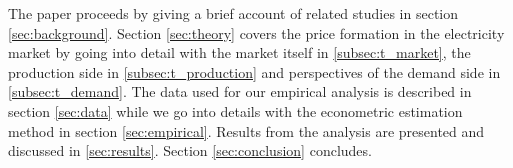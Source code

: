 The paper proceeds by giving a brief account of related studies in section \ref{sec:background}. Section \ref{sec:theory} covers the price formation in the electricity market by going into detail with the market itself in \ref{subsec:t_market}, the production side in \ref{subsec:t_production} and perspectives of the demand side in \ref{subsec:t_demand}. The data used for our empirical analysis is described in section \ref{sec:data} while we go into details with the econometric estimation method in section \ref{sec:empirical}. Results from the analysis are presented and discussed in \ref{sec:results}. Section \ref{sec:conclusion} concludes. 

